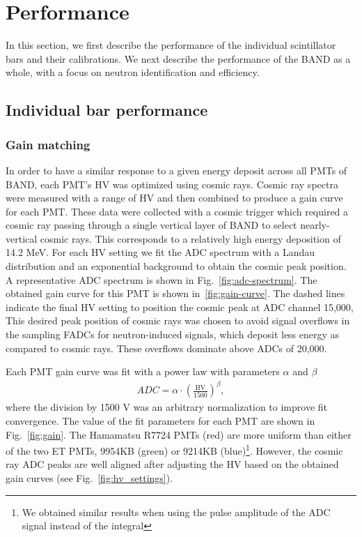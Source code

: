 \documentclass[3p,twocolumn]{elsarticle}
\begin{document}
\section{Performance}
In this section, we first describe the performance of the individual scintillator bars and their calibrations. We next describe the performance
of the BAND as a whole, with a focus on neutron identification and efficiency.

\subsection{Individual bar performance}
\subsubsection{Gain matching}
In order to have a similar response to a given energy deposit across all PMTs of BAND, each PMT's HV was optimized using cosmic rays. Cosmic
ray spectra were measured with a range of HV and then combined to produce a gain curve for each PMT. These data were
collected with a cosmic trigger which required a cosmic ray passing through a single vertical layer of BAND to select nearly-vertical
cosmic rays. This corresponds to a relatively high energy deposition of 14.2 \si{\mega\eV}. For each HV setting we fit the ADC spectrum
with a Landau distribution and an exponential background to obtain the cosmic peak position. A representative ADC spectrum is shown in
Fig.~\ref{fig:adc-spectrum}.  The obtained gain curve for this PMT is shown in~\ref{fig:gain-curve}. The dashed lines indicate the final HV
setting to position the cosmic peak at ADC channel 15,000, This desired peak
 position of cosmic rays was chosen to avoid signal overflows in the sampling FADCs for neutron-induced signals, which deposit less energy as compared to cosmic rays. These overflows dominate above ADCs of 20,000. 

Each PMT gain curve was fit with a power law with parameters $\alpha$ and $\beta$
\begin{eqnarray}
	ADC	= \alpha \cdot \left(\frac{\mathrm{HV}}{1500}\right)^{\beta},				
		\label{eqn:gain_curve}
\end{eqnarray}
where the division by 1500 \si{\volt} was an arbitrary normalization to improve fit convergence. The value of the fit parameters for each PMT are
shown in Fig.~\ref{fig:gain}. The Hamamatsu R7724 PMTs (red) are more uniform than either of the two ET PMTs, 9954KB (green) or
9214KB (blue)\footnote{We obtained similar results when using the pulse amplitude of the ADC signal instead of the integral}. 
However, the cosmic ray ADC peaks are well aligned after adjusting the HV based on the obtained gain curves (see Fig.~\ref{fig:hv_settings}).
\end{document}
